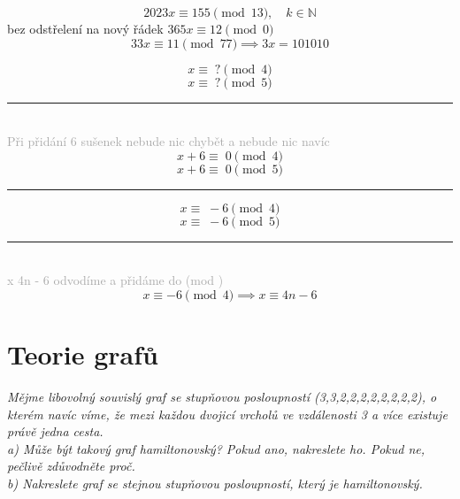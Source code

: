 \documentclass[a4paper, 10pt, oneside]{article}       %
\begin{document}
$$2023x\equiv 155\pmod{13},\quad k\in\mathbb{N}$$
bez odstřelení na nový řádek $365x \equiv 12 \pmod{0}$
\[33x\equiv 11\pmod{77}\implies 3x=101010\]

\begin{center}
    $$x\equiv \;?\pmod{4}$$
    $$x\equiv \;?\pmod{5}$$
    \rule{5cm}{0.4pt} \\
    \textcolor{darkgray}{Při přidání 6 sušenek nebude nic chybět a nebude nic navíc}
    $$x + 6\equiv \;0\pmod{4}$$
    $$x + 6\equiv \;0\pmod{5}$$
    \rule{5cm}{0.4pt}
    $$x\equiv \;-6\pmod{4}$$
    $$x\equiv \;-6\pmod{5}$$
    \rule{5cm}{0.4pt}\\
    \textcolor{darkgray}{x \equiv 4n - 6 \;odvodíme \;a \;přidáme \;do \;(mod )}\\
    $$x \equiv -6 \pmod{4} \implies x \equiv 4n - 6$$
\end{center}



\newpage
\section{Teorie grafů}\label{sec:sec_2}

\textit{Mějme libovolný souvislý graf se stupňovou posloupností (3,3,2,2,2,2,2,2,2,2), o kterém navíc víme,
    že mezi každou dvojicí vrcholů ve vzdálenosti 3 a více existuje právě jedna cesta.\\
a) Může být takový graf hamiltonovský? Pokud ano, nakreslete ho. Pokud ne, pečlivě zdůvodněte proč.\\
b) Nakreslete graf se stejnou stupňovou posloupností, který je hamiltonovský.}
\end{document}
